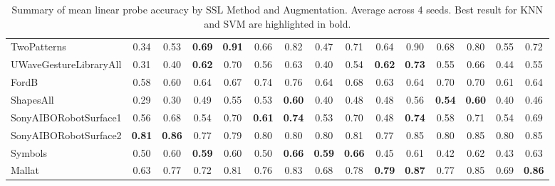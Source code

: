 \documentclass[../../thesis.tex]{subfiles}
\begin{document}
\begin{table}[H]
\begin{adjustbox}{width=\textwidth}
\begin{tabular}{lcc|cc|cc|cc|cc|cc|cc}
        TwoPatterns             & 0.34 & 0.53 & \textbf{0.69} &\textbf{ 0.91} & 0.66 & 0.82 & 0.47 & 0.71 & 0.64 & 0.90 & 0.68 & 0.80 & 0.55 & 0.72 \\
        UWaveGestureLibraryAll  & 0.31 & 0.40 & \textbf{0.62} & 0.70 & 0.56 & 0.63 & 0.40 & 0.54 & \textbf{0.62} & \textbf{0.73} & 0.55 & 0.66 & 0.44 & 0.55 \\
        FordB                   & 0.58 & 0.60 & 0.64 & 0.67 & 0.74 & 0.76 & 0.64 & 0.68 & 0.63 & 0.64 & 0.70 & 0.70 & 0.61 & 0.64\\
        ShapesAll               & 0.29 & 0.30 & 0.49 & 0.55 & 0.53 & \textbf{0.60} & 0.40 & 0.48 & 0.48 & 0.56 &\textbf{ 0.54} & \textbf{0.60} & 0.40 & 0.46 \\
        SonyAIBORobotSurface1   & 0.56 & 0.68 & 0.54 & 0.70 & \textbf{0.61} & \textbf{0.74} & 0.53 & 0.70 & 0.48 & \textbf{0.74} & 0.58 & 0.71 & 0.54 & 0.69 \\
        SonyAIBORobotSurface2   & \textbf{0.81} & \textbf{0.86} & 0.77 & 0.79 & 0.80 & 0.80 & 0.80 & 0.81 & 0.77 & 0.85 & 0.80 & 0.85 & 0.80 & 0.85  \\
        Symbols                 & 0.50 & 0.60 & \textbf{0.59} & 0.60 & 0.50 & \textbf{0.66} & \textbf{0.59} & \textbf{0.66} & 0.45 & 0.61 & 0.42 & 0.62 & 0.43 & 0.63 \\
        Mallat                  & 0.63 & 0.77 & 0.72 & 0.81 & 0.76 & 0.83 & 0.68 & 0.78 & \textbf{0.79} & \textbf{0.87} & 0.77 & 0.85 & 0.69 & \textbf{0.86} \\
        \bottomrule
    \end{tabular}
    \end{adjustbox}
    
    \caption{Summary of mean linear probe accuracy by SSL Method and Augmentation. Average across 4 seeds. Best result for KNN and SVM are highlighted in bold.}
    \label{tab:mean_probe}
\end{table}
\end{document}
